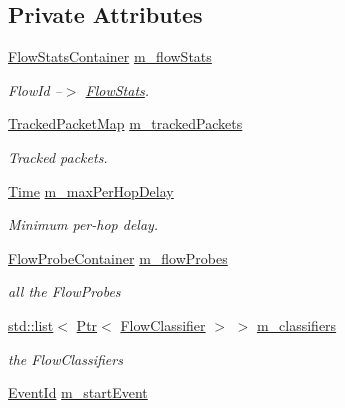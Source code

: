 \subsection*{Private Attributes}
\begin{DoxyCompactItemize}
\item 
\hyperlink{classns3_1_1FlowMonitor_a6dc86073dee117ed141b8871990c074f}{Flow\+Stats\+Container} \hyperlink{classns3_1_1FlowMonitor_a2699e372608a07801e1d1028377d08da}{m\+\_\+flow\+Stats}
\begin{DoxyCompactList}\small\item\em Flow\+Id --$>$ \hyperlink{structns3_1_1FlowMonitor_1_1FlowStats}{Flow\+Stats}. \end{DoxyCompactList}\item 
\hyperlink{classns3_1_1FlowMonitor_a52f3dc79e3f9c4e60e70064ffb306b53}{Tracked\+Packet\+Map} \hyperlink{classns3_1_1FlowMonitor_ab4f63ca5c2a927337870110fa8233bce}{m\+\_\+tracked\+Packets}
\begin{DoxyCompactList}\small\item\em Tracked packets. \end{DoxyCompactList}\item 
\hyperlink{classns3_1_1Time}{Time} \hyperlink{classns3_1_1FlowMonitor_a9f05e6d42213432dc8a6f79510b38b6c}{m\+\_\+max\+Per\+Hop\+Delay}
\begin{DoxyCompactList}\small\item\em Minimum per-\/hop delay. \end{DoxyCompactList}\item 
\hyperlink{classns3_1_1FlowMonitor_a35214d6743fdb20acd43eff946b2050d}{Flow\+Probe\+Container} \hyperlink{classns3_1_1FlowMonitor_a0314b0765cde07cbe496de63e663b007}{m\+\_\+flow\+Probes}
\begin{DoxyCompactList}\small\item\em all the Flow\+Probes \end{DoxyCompactList}\item 
\hyperlink{openflow-interface_8h_afd9bcfa176617760671b67580f536fa7}{std\+::list}$<$ \hyperlink{classns3_1_1Ptr}{Ptr}$<$ \hyperlink{classns3_1_1FlowClassifier}{Flow\+Classifier} $>$ $>$ \hyperlink{classns3_1_1FlowMonitor_a5a4e22e2b8a08b926f5f054ae082a60b}{m\+\_\+classifiers}
\begin{DoxyCompactList}\small\item\em the Flow\+Classifiers \end{DoxyCompactList}\item 
\hyperlink{classns3_1_1EventId}{Event\+Id} \hyperlink{classns3_1_1FlowMonitor_a581fcc5591d673b3509967245cd447ea}{m\+\_\+start\+Event}

\end{DoxyCompactItemize}
